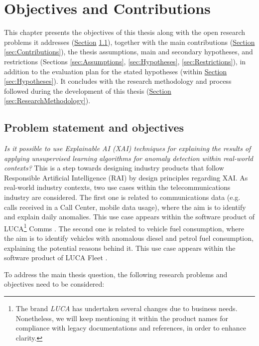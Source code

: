 \chapter{Objectives and Contributions}\label{chap:3-objetives}

This chapter presents the objectives of this thesis along with the open research problems it addresses (\hyperref[sec:Objectives]{Section} \ref{sec:Objectives}), together with the main contributions (\hyperref[sec:Objectives]{Section} \ref{sec:Contributions}), the thesis assumptions, main and secondary hypotheses, and restrictions (Sections \ref{sec:Assumptions}, \ref{sec:Hypotheses}, \ref{sec:Restrictions}), in addition to the evaluation plan for the stated hypotheses (within \hyperref[sec:Hypotheses]{Section} \ref{sec:Hypotheses}). It concludes with the research methodology and process followed during the development of this thesis (\hyperref[sec:ResearchMethodology]{Section} \ref{sec:ResearchMethodology}).


\section{Problem statement and objectives}\label{sec:Objectives}
\textit{Is it possible to use Explainable AI (XAI) techniques for explaining the results of applying unsupervised learning algorithms for anomaly detection within real-world contexts?} This is a step towards designing industry products that follow Responsible Artificial Intelligence (RAI) by design principles regarding XAI. As real-world industry contexts, two use cases within the telecommunications industry are considered. 
The first one is related to communications data (e.g. calls received in a Call Center, mobile data usage), where the aim is to identify and explain daily anomalies. This use case appears within the software product of LUCA\footnote{The brand \textit{LUCA} has undertaken several changes due to business needs. Nonetheless, we will keep mentioning it within the product names for compliance with legacy documentations and references, in order to enhance clarity.} Comms \parencite{LUCAComms}.
The second one is related to vehicle fuel consumption, where the aim is to identify vehicles with anomalous diesel and petrol fuel consumption, explaining the potential reasons behind it. This use case appears within the software product of LUCA Fleet \parencite{LUCAFleet}.

To address the main thesis question, the following research problems and objectives need to be considered:

